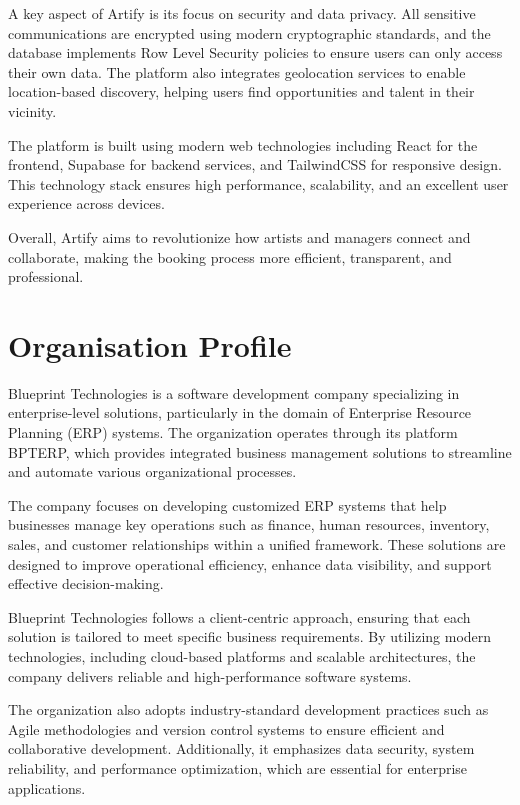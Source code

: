 \documentclass[12pt,a4paper]{report}
\begin{document}
A key aspect of Artify is its focus on security and data privacy. All sensitive communications are encrypted using modern cryptographic standards, and the database implements Row Level Security policies to ensure users can only access their own data. The platform also integrates geolocation services to enable location-based discovery, helping users find opportunities and talent in their vicinity.

The platform is built using modern web technologies including React for the frontend, Supabase for backend services, and TailwindCSS for responsive design. This technology stack ensures high performance, scalability, and an excellent user experience across devices.

Overall, Artify aims to revolutionize how artists and managers connect and collaborate, making the booking process more efficient, transparent, and professional.

\section{Organisation Profile}
Blueprint Technologies is a software development company specializing in enterprise-level solutions, particularly in the domain of Enterprise Resource Planning (ERP) systems. The organization operates through its platform BPTERP, which provides integrated business management solutions to streamline and automate various organizational processes.

The company focuses on developing customized ERP systems that help businesses manage key operations such as finance, human resources, inventory, sales, and customer relationships within a unified framework. These solutions are designed to improve operational efficiency, enhance data visibility, and support effective decision-making.

Blueprint Technologies follows a client-centric approach, ensuring that each solution is tailored to meet specific business requirements. By utilizing modern technologies, including cloud-based platforms and scalable architectures, the company delivers reliable and high-performance software systems.

The organization also adopts industry-standard development practices such as Agile methodologies and version control systems to ensure efficient and collaborative development. Additionally, it emphasizes data security, system reliability, and performance optimization, which are essential for enterprise applications.
\end{document}
